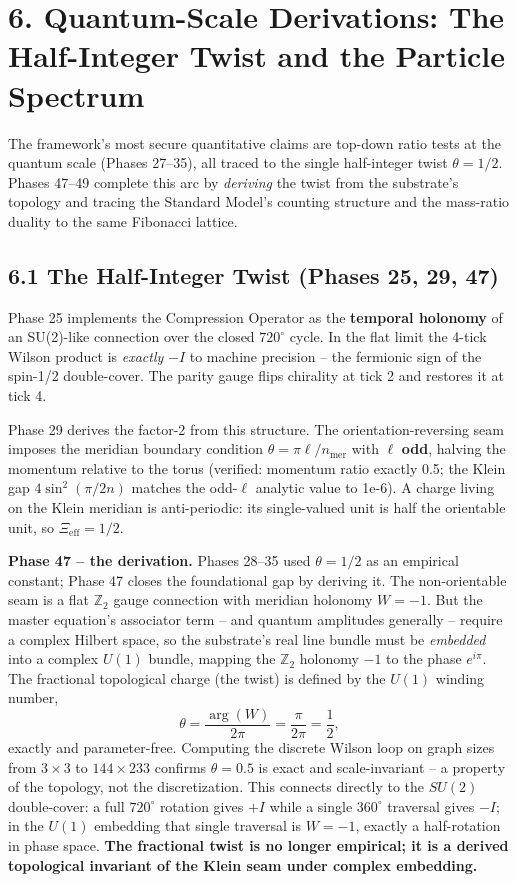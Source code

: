 \documentclass[
  11pt,
]{article}
\begin{document}
\section{6. Quantum-Scale Derivations: The Half-Integer Twist and the
Particle
Spectrum}\label{quantum-scale-derivations-the-half-integer-twist-and-the-particle-spectrum}

The framework's most secure quantitative claims are top-down ratio tests
at the quantum scale (Phases 27--35), all traced to the single
half-integer twist \(\theta = 1/2\). Phases 47--49 complete this arc by
\emph{deriving} the twist from the substrate's topology and tracing the
Standard Model's counting structure and the mass-ratio duality to the
same Fibonacci lattice.

\subsection{6.1 The Half-Integer Twist (Phases 25, 29,
47)}\label{the-half-integer-twist-phases-25-29-47}

Phase 25 implements the Compression Operator as the \textbf{temporal
holonomy} of an SU(2)-like connection over the closed \(720^{\circ}\)
cycle. In the flat limit the 4-tick Wilson product is \emph{exactly}
\(-I\) to machine precision -- the fermionic sign of the spin-1/2
double-cover. The parity gauge flips chirality at tick 2 and restores it
at tick 4.

Phase 29 derives the factor-2 from this structure. The
orientation-reversing seam imposes the meridian boundary condition
\(\theta = \pi\ell/n_{\text{mer}}\) with \(\ell\) \textbf{odd}, halving
the momentum relative to the torus (verified: momentum ratio exactly
0.5; the Klein gap \(4\sin^2(\pi/2n)\) matches the odd-\(\ell\) analytic
value to 1e-6). A charge living on the Klein meridian is anti-periodic:
its single-valued unit is half the orientable unit, so
\(\Xi_{\text{eff}} = 1/2\).

\textbf{Phase 47 -- the derivation.} Phases 28--35 used \(\theta = 1/2\)
as an empirical constant; Phase 47 closes the foundational gap by
deriving it. The non-orientable seam is a flat \(\mathbb{Z}_2\) gauge
connection with meridian holonomy \(W = -1\). But the master equation's
associator term -- and quantum amplitudes generally -- require a complex
Hilbert space, so the substrate's real line bundle must be
\emph{embedded} into a complex \(U(1)\) bundle, mapping the
\(\mathbb{Z}_2\) holonomy \(-1\) to the phase \(e^{i\pi}\). The
fractional topological charge (the twist) is defined by the \(U(1)\)
winding number,
\[\theta = \frac{\arg(W)}{2\pi} = \frac{\pi}{2\pi} = \frac{1}{2},\]
exactly and parameter-free. Computing the discrete Wilson loop on graph
sizes from \(3 \times 3\) to \(144 \times 233\) confirms
\(\theta = 0.5\) is exact and scale-invariant -- a property of the
topology, not the discretization. This connects directly to the
\(SU(2)\) double-cover: a full \(720^{\circ}\) rotation gives \(+I\)
while a single \(360^{\circ}\) traversal gives \(-I\); in the \(U(1)\)
embedding that single traversal is \(W = -1\), exactly a half-rotation
in phase space. \textbf{The fractional twist is no longer empirical; it
is a derived topological invariant of the Klein seam under complex
embedding.}
\end{document}
